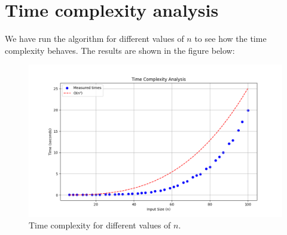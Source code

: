 \section{Time complexity analysis}

We have run the algorithm for different values of $n$ to see how the time complexity behaves.
The results are shown in the figure below:

\begin{figure}[H]
    \centering
    \includegraphics[width=1\textwidth]{figuras/time_complexity.png}
    \caption{Time complexity for different values of $n$.}
    \label{fig:time_complexity}
\end{figure}
